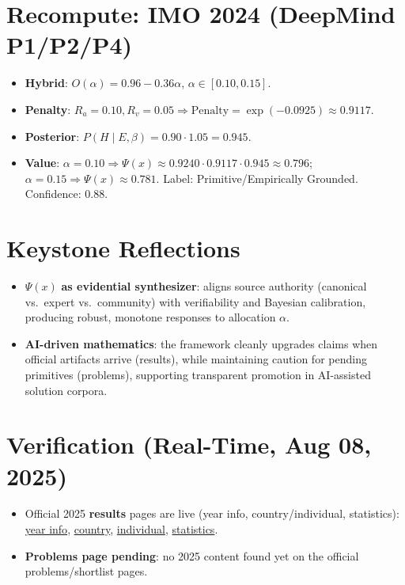 \documentclass[11pt]{article}
\newcommand{\Px}{\Psi(x)}
\newcommand{\post}{P(H\mid E,\beta)}
\newcommand{\pen}{\mathrm{Penalty}}
\begin{document}
\section{Recompute: IMO 2024 (DeepMind P1/P2/P4)}
\begin{itemize}[leftmargin=1.2em]
  \item \textbf{Hybrid}: $O(\alpha)=0.96-0.36\alpha$, $\alpha\in[0.10,0.15]$.
  \item \textbf{Penalty}: $R_a{=}0.10,R_v{=}0.05\Rightarrow \pen=\exp(-0.0925)\approx 0.9117$.
  \item \textbf{Posterior}: $\post=0.90\cdot 1.05=0.945$.
  \item \textbf{Value}: $\alpha{=}0.10\Rightarrow \Px\approx 0.9240\cdot 0.9117\cdot 0.945\approx \mathbf{0.796}$;
        $\alpha{=}0.15\Rightarrow \Px\approx \mathbf{0.781}$.
        Label: Primitive/Empirically Grounded. Confidence: 0.88.
\end{itemize}

\section{Keystone Reflections}
\begin{itemize}[leftmargin=1.2em]
  \item $\Px$ \textbf{as evidential synthesizer}: aligns source authority (canonical vs.\ expert vs.\ community) with verifiability and Bayesian calibration, producing robust, monotone responses to allocation $\alpha$.
  \item \textbf{AI-driven mathematics}: the framework cleanly upgrades claims when official artifacts arrive (results), while maintaining caution for pending primitives (problems), supporting transparent promotion in AI-assisted solution corpora.
\end{itemize}

\section{Verification (Real-Time, Aug 08, 2025)}
\begin{itemize}[leftmargin=1.2em]
  \item Official 2025 \textbf{results} pages are live (year info, country/individual, statistics):
  \href{https://imo-official.org/year_info.aspx?year=2025}{year info},
  \href{https://imo-official.org/year_country_r.aspx?year=2025}{country},
  \href{https://imo-official.org/year_individual_r.aspx?year=2025}{individual},
  \href{https://imo-official.org/year_statistics.aspx?year=2025}{statistics}.
  \item \textbf{Problems page pending}: no 2025 content found yet on the official problems/shortlist pages.
\end{itemize}
\end{document}
